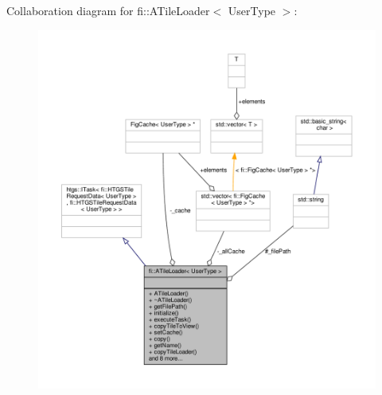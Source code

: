 Collaboration diagram for fi\+:\+:A\+Tile\+Loader$<$ User\+Type $>$\+:
\nopagebreak
\begin{figure}[H]
\begin{center}
\leavevmode
\includegraphics[width=350pt]{d6/deb/classfi_1_1ATileLoader__coll__graph}
\end{center}
\end{figure}
